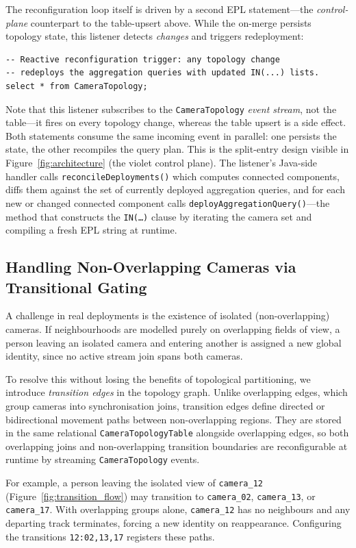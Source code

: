 \documentclass[review]{elsarticle}
\begin{document}
The reconfiguration loop itself is driven by a second EPL statement---the \emph{control-plane} counterpart to the table-upsert above. While the on-merge persists topology state, this listener detects \emph{changes} and triggers redeployment:
\begin{verbatim}
-- Reactive reconfiguration trigger: any topology change
-- redeploys the aggregation queries with updated IN(...) lists.
select * from CameraTopology;
\end{verbatim}
Note that this listener subscribes to the \texttt{CameraTopology} \emph{event stream}, not the table---it fires on every topology change, whereas the table upsert is a side effect. Both statements consume the same incoming event in parallel: one persists the state, the other recompiles the query plan. This is the split-entry design visible in Figure~\ref{fig:architecture} (the violet control plane). The listener's Java-side handler calls \texttt{reconcileDeployments()} which computes connected components, diffs them against the set of currently deployed aggregation queries, and for each new or changed connected component calls \texttt{deployAggregationQuery()}---the method that constructs the \texttt{IN(\dots)} clause by iterating the camera set and compiling a fresh EPL string at runtime.

\subsection{Handling Non-Overlapping Cameras via Transitional Gating}
\label{sec:multi:transition}
A challenge in real deployments is the existence of isolated (non-overlapping) cameras. If neighbourhoods are modelled purely on overlapping fields of view, a person leaving an isolated camera and entering another is assigned a new global identity, since no active stream join spans both cameras.

To resolve this without losing the benefits of topological partitioning, we introduce \emph{transition edges} in the topology graph. Unlike overlapping edges, which group cameras into synchronisation joins, transition edges define directed or bidirectional movement paths between non-overlapping regions. They are stored in the same relational \texttt{CameraTopologyTable} alongside overlapping edges, so both overlapping joins and non-overlapping transition boundaries are reconfigurable at runtime by streaming \texttt{CameraTopology} events.

For example, a person leaving the isolated view of \texttt{camera\_12} (Figure~\ref{fig:transition_flow}) may transition to \texttt{camera\_02}, \texttt{camera\_13}, or \texttt{camera\_17}. With overlapping groups alone, \texttt{camera\_12} has no neighbours and any departing track terminates, forcing a new identity on reappearance. Configuring the transitions \texttt{12:02,13,17} registers these paths.
\end{document}
